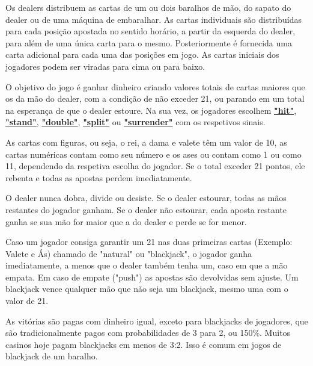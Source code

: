 \documentclass{report}
\begin{document}
Os dealers distribuem as cartas de um ou dois baralhos de mão, do sapato do dealer ou de uma máquina de embaralhar. As cartas individuais são distribuídas para cada posição apostada no sentido horário, a partir da esquerda do dealer, para além de uma única carta para o mesmo. Posteriormente é fornecida uma carta adicional para cada uma das posições em jogo. As cartas iniciais dos jogadores podem ser viradas para cima ou para baixo.
 
O objetivo do jogo é ganhar dinheiro criando valores totais de cartas maiores que os da mão do dealer, com a condição de não exceder 21, ou parando em um total na esperança de que o dealer estoure. Na sua vez, os jogadores escolhem \hyperlink{Decisões do jogador}{\textbf{"hit"}}, \hyperlink{Decisões do jogador}{\textbf{"stand"}}, \hyperlink{Decisões do jogador}{\textbf{"double"}}, \hyperlink{Decisões do jogador}{\textbf{"split"}} ou \hyperlink{Decisões do jogador}{\textbf{"surrender"}} com os respetivos sinais.
 
As cartas com figuras, ou seja, o rei, a dama e valete têm um valor de 10, as cartas numéricas contam como seu número e os ases ou contam como 1 ou como 11, dependendo da respetiva escolha do jogador. Se o total exceder 21 pontos, ele rebenta e todas as apostas perdem imediatamente.
 
O dealer nunca dobra, divide ou desiste. Se o dealer estourar, todas as mãos restantes do jogador ganham. Se o dealer não estourar, cada aposta restante ganha se sua mão for maior que a do dealer e perde se for menor.
 
Caso um jogador consiga garantir um 21 nas duas primeiras cartas (Exemplo: Valete e Ás) chamado de "natural" ou "blackjack", o jogador ganha imediatamente, a menos que o dealer também tenha um, caso em que a mão empata. Em caso de empate ("push") as apostas são devolvidas sem ajuste. Um blackjack vence qualquer mão que não seja um blackjack, mesmo uma com o valor de 21.
 
As vitórias são pagas com dinheiro igual, exceto para blackjacks de jogadores, que são tradicionalmente pagos com probabilidades de 3 para 2, ou 150\%. Muitos casinos hoje pagam blackjacks em menos de 3:2. Isso é comum em jogos de blackjack de um baralho.
\end{document}
